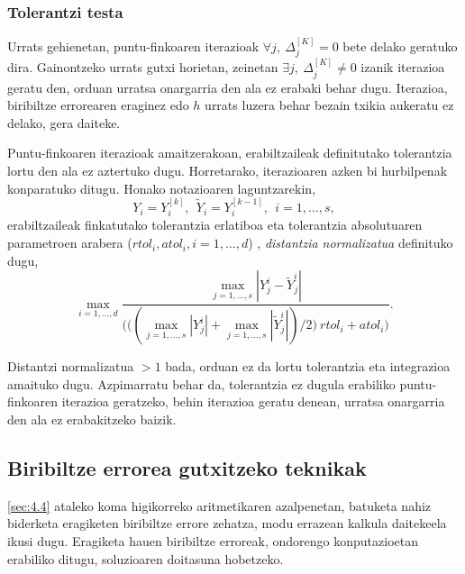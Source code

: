 \subsubsection*{Tolerantzi testa}

Urrats gehienetan, puntu-finkoaren iterazioak $\forall j, \ \Delta_{j}^{[K]}=0$ bete delako geratuko dira. Gainontzeko urrats gutxi horietan, zeinetan  $\exists j,  \ \Delta_{j}^{[K]} \neq 0$ izanik iterazioa geratu den, orduan  urratsa onargarria den ala ez erabaki behar dugu. Iterazioa, biribiltze errorearen eraginez edo $h$ urrats luzera  behar bezain txikia aukeratu ez delako, gera daiteke.

Puntu-finkoaren iterazioak amaitzerakoan, erabiltzaileak definitutako tolerantzia lortu den ala ez aztertuko dugu. Horretarako, iterazioaren azken bi hurbilpenak konparatuko ditugu. Honako notazioaren laguntzarekin,
\begin{equation*}
Y_i=Y_i^{[k]}, \ \ \tilde{Y}_i=Y_i^{[k-1]}, \ \ i=1,\dots,s,
\end{equation*}  
erabiltzaileak finkatutako tolerantzia erlatiboa eta tolerantzia absolutuaren parametroen arabera ($rtol_i,atol_i, i=1,\dots,d$) , \emph{distantzia normalizatua} definituko dugu,
\begin{equation*}
\max_{i=1,\dots,d} \frac{\max_{j=1,\dots,s} |Y_j^i-\tilde{Y}_j^i|}
                        {\bigg(\big((\max_{j=1,\dots,s} |Y_j^i|+\max_{j=1,\dots,s} |\tilde{Y}_j^i|)/2 \big) \ rtol_i+ atol_i \bigg)}.
\end{equation*}

Distantzi normalizatua $>1$ bada, orduan ez da lortu tolerantzia eta integrazioa amaituko dugu.
Azpimarratu behar da, tolerantzia ez dugula erabiliko puntu-finkoaren iterazioa geratzeko, behin iterazioa geratu denean, urratsa onargarria den ala ez erabakitzeko baizik.

\subsection{Biribiltze errorea gutxitzeko teknikak}

\ref{sec:4.4} ataleko koma higikorreko aritmetikaren azalpenetan, batuketa nahiz biderketa eragiketen biribiltze errore zehatza, modu errazean kalkula daitekeela ikusi dugu. Eragiketa hauen biribiltze erroreak, ondorengo konputazioetan erabiliko ditugu, soluzioaren doitasuna hobetzeko.

